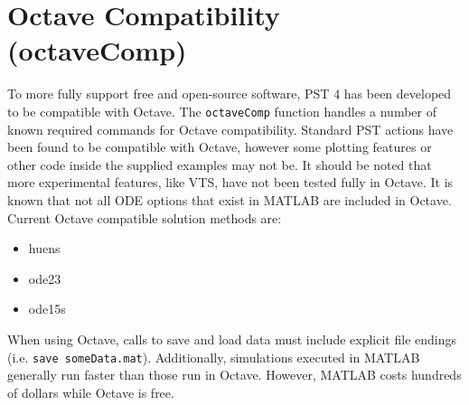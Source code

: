 \section{Octave Compatibility (octaveComp)}
To more fully support free and open-source software, PST 4 has been developed to be compatible with Octave.
The \verb|octaveComp| function handles a number of known required commands for Octave compatibility.
Standard PST actions have been found to be compatible with Octave, however some plotting features or other code inside the supplied examples may not be.
It should be noted that more experimental features, like VTS, have not been tested fully in Octave.
It is known that not all ODE options that exist in MATLAB are included in Octave.
Current Octave compatible solution methods are:
\begin{itemize}
 em
\singlespacing
\item huens
\item ode23
\item ode15s
\end{itemize}
When using Octave, calls to save and load data must include explicit file endings (i.e. \verb|save someData.mat|).
Additionally, simulations executed in MATLAB generally run faster than those run in Octave.
However, MATLAB costs hundreds of dollars while Octave is free.
